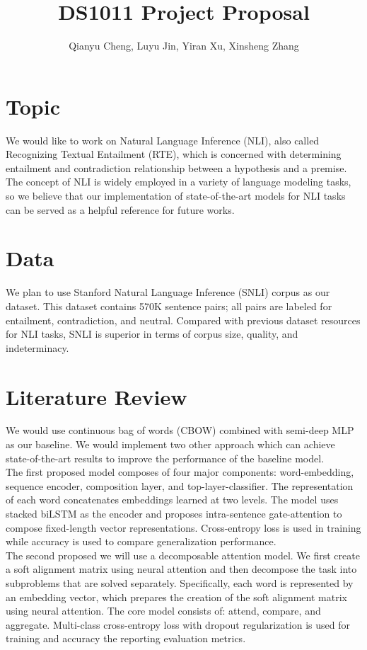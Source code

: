 \documentclass[a4paper]{article}
\title{DS1011 Project Proposal}
\author{Qianyu Cheng, Luyu Jin, Yiran Xu, Xinsheng Zhang
}
\begin{document}
\maketitle


\section{Topic}

We would like to work on Natural Language Inference (NLI), also called Recognizing Textual Entailment (RTE), which is concerned with determining entailment and contradiction relationship between a hypothesis and a premise. The concept of NLI is widely employed in a variety of language modeling tasks, so we believe that our implementation of state-of-the-art models for NLI tasks can be served as a helpful reference for future works. \\

\section{Data}
We plan to use Stanford Natural Language Inference (SNLI) corpus as our dataset. This dataset contains 570K sentence pairs\cite{Bowman15}; all pairs are labeled for entailment, contradiction, and neutral. Compared with previous dataset resources for NLI tasks, SNLI is superior in terms of corpus size, quality, and indeterminacy. \\


\section{Literature Review}
We would use continuous bag of words (CBOW) combined with semi-deep MLP as our baseline. We would implement two other approach which can achieve state-of-the-art results to improve the performance of the baseline model. \\

\noindent The first proposed model composes of four major components: word-embedding, sequence encoder, composition layer, and top-layer-classifier. The representation of each word concatenates embeddings learned at two levels. The model uses stacked biLSTM as the encoder and proposes intra-sentence gate-attention to compose fixed-length vector representations\cite{Chen17}. Cross-entropy loss is used in training while accuracy is used to compare generalization performance. \\

\noindent The second proposed we will use a decomposable attention model. We first create a soft alignment matrix using neural attention and then decompose the task into subproblems that are solved separately\cite{Parikh16}. Specifically, each word is represented by an embedding vector, which prepares the creation of the soft alignment matrix using neural attention. The core model consists of: attend, compare, and aggregate. Multi-class cross-entropy loss with dropout regularization is used for training and accuracy the reporting evaluation metrics.  



\end{document}
